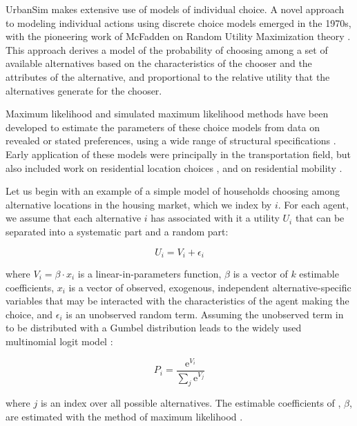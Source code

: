 UrbanSim makes extensive use of models of individual choice. A novel approach to modeling individual actions using discrete choice models emerged in the 1970s, with the pioneering work of McFadden on Random Utility Maximization theory \citep{mcfadden-1974,mcfadden-1981}. This approach derives a model of the probability of choosing among a set of available alternatives based on the characteristics of the chooser and the attributes of the alternative, and proportional to the relative utility that the alternatives generate for the chooser.

Maximum likelihood and simulated maximum likelihood methods have been developed to estimate the parameters of these choice models from data on revealed or stated preferences, using a wide range of structural specifications \citep{train-book-2003}. Early application of these models were principally in the transportation field, but also included work on residential location choices \citep{quigley-eer-1976,lerman-trr-1977,mcfadden-1978}, and on residential mobility \citep{clark-vanlierop-1986}.

Let us begin with an example of a simple model of households choosing among alternative locations in the housing market, which we index by $i$. For each agent, we assume that each alternative $i$ has associated with it a utility $U_i$ that can be separated into a systematic part and a random part:

\begin{equation}
    \label{eq:utility}
    U_i = V_i + \epsilon_i
\end{equation}

where $V_i = \beta\cdot {x}_i$ is a linear-in-parameters function, $\beta$ is a vector of $k$ estimable coefficients, $x_i$ is a vector of observed, exogenous, independent alternative-specific variables that may be interacted with the characteristics of the agent making the choice, and $\epsilon_i$ is an unobserved random term. Assuming the unobserved term in  to be distributed with a Gumbel distribution leads to the widely used multinomial logit model \citep{mcfadden-1974,mcfadden-1981}:

\begin{equation}
    \label{eq:mnl}
    P_i = \frac{\mathrm{e}^{V_i}}{\sum_j \mathrm{e}^{V_j}}
\end{equation}

where $j$ is an index over all possible alternatives. The estimable coefficients of , $\beta$, are estimated with the method of maximum likelihood \citep{greene-2002}.


